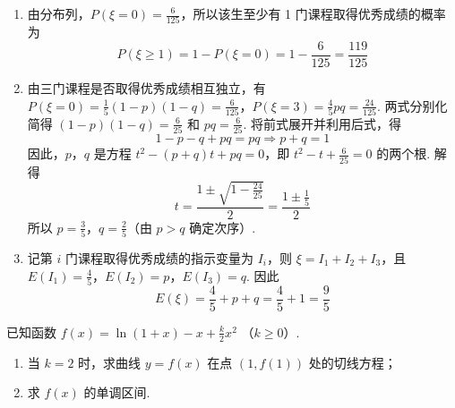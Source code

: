 \begin{solution}
\begin{enumerate}
\item 由分布列，\(P(\xi=0)=\frac{6}{125}\)，所以该生至少有 1 门课程取得优秀成绩的概率为
\[
P(\xi\geqslant1)=1-P(\xi=0)=1-\frac{6}{125}=\frac{119}{125}
\]

\item 由三门课程是否取得优秀成绩相互独立，有
\(P(\xi=0)=\frac{1}{5}(1-p)(1-q)=\frac{6}{125}\)，\(P(\xi=3)=\frac{4}{5}pq=\frac{24}{125}\).
两式分别化简得 \((1-p)(1-q)=\frac{6}{25}\) 和 \(pq=\frac{6}{25}\). 将前式展开并利用后式，得
\[
1-p-q+pq=pq\Longrightarrow p+q=1
\]
因此，\(p\)，\(q\) 是方程 \(t^{2}-(p+q)t+pq=0\)，即 \(t^{2}-t+\frac{6}{25}=0\) 的两个根. 解得
\[
t=\frac{1\pm\sqrt{1-\frac{24}{25}}}{2}=\frac{1\pm\frac{1}{5}}{2}
\]
所以 \(p=\frac{3}{5}\)，\(q=\frac{2}{5}\)（由 \(p>q\) 确定次序）.

\item
记第 \(i\) 门课程取得优秀成绩的指示变量为 \(I_i\)，则 \(\xi=I_1+I_2+I_3\)，且 \(E(I_1)=\frac{4}{5}\)，\(E(I_2)=p\)，\(E(I_3)=q\). 因此
\[
E(\xi)=\frac{4}{5}+p+q=\frac{4}{5}+1=\frac{9}{5}
\]
\end{enumerate}
\end{solution}

\begin{problem}
已知函数 \( f(x) = \ln\left(1 + x\right) - x + \frac{k}{2}x^2 \) （\(k \geqslant 0\)）.
\begin{enumerate}
\item 当 \(k=2\) 时，求曲线 \( y=f(x) \) 在点 \( (1,f(1)) \) 处的切线方程；
\item 求 \( f(x) \) 的单调区间.
\end{enumerate}
\end{problem}

